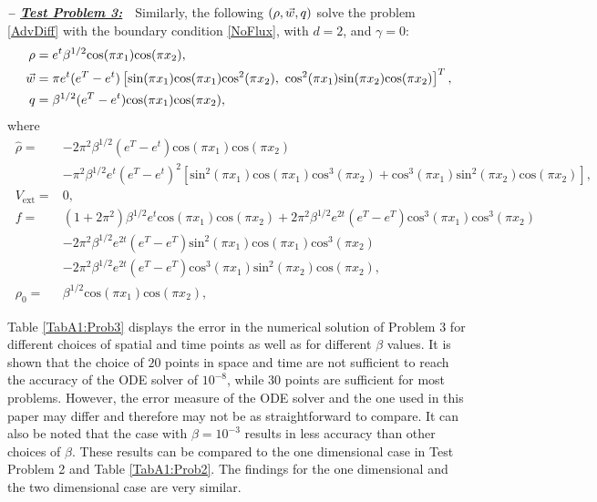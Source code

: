 \textbf{\emph{-- \underline{Test Problem 3:}}}~~Similarly, the following $(\rho,\vec{w},q)$ solve the problem \eqref{AdvDiff} with the boundary condition \eqref{NoFlux}, with $d=2$, and $\gamma =0$:
\begin{align*}
\ \rho={}&e^{t}\beta^{1/2}\text{cos}(\pi{}x_1)\text{cos}(\pi{}x_2), \\
\ \vec{w}={}&\pi e^{t}(e^{T}-e^{t})\left[\text{sin}(\pi{}x_1)\text{cos}(\pi{}x_1)\text{cos}^2(\pi{}x_2),~\text{cos}^2(\pi{}x_1)\text{sin}(\pi{}x_2)\text{cos}(\pi{}x_2)\right]^T, \\
\ \adj={}&\beta^{1/2}(e^{T}-e^{t})\text{cos}(\pi{}x_1)\text{cos}(\pi{}x_2),
\end{align*}
where
\begin{align*}
\ \widehat{\rho}={}&-2\pi^2{}\beta^{1/2}(e^{T}-e^{t})\text{cos}(\pi{}x_1)\text{cos}(\pi{}x_2) \\
\ &-\pi^2\beta^{1/2}e^{t}(e^{T}-e^{t})^2\left[\text{sin}^2(\pi{}x_1)\text{cos}(\pi{}x_1)\text{cos}^3(\pi{}x_2)+\text{cos}^3(\pi{}x_1)\text{sin}^2(\pi{}x_2)\text{cos}(\pi{}x_2)\right], \\
\ V_{\text{ext}}={}&0, \\
\ f={}&(1+2\pi^2)\beta^{1/2}e^{t}\text{cos}(\pi{}x_1)\text{cos}(\pi{}x_2)+ 2\pi^2 \beta^{1/2}e^{2t}(e^{T}-e^{T})\text{cos}^3(\pi{}x_1)\text{cos}^3(\pi{}x_2) \\
\ &-2\pi^2 \beta^{1/2}e^{2t}(e^{T}-e^{T})\text{sin}^2(\pi{}x_1)\text{cos}(\pi{}x_1)\text{cos}^3(\pi{}x_2) \\
\ &-2\pi^2 \beta^{1/2}e^{2t}(e^{T}-e^{T})\text{cos}^3(\pi{}x_1)\text{sin}^2(\pi{}x_2)\text{cos}(\pi{}x_2), \\
\ \rho_{0}={}&\beta^{1/2}\text{cos}(\pi{}x_1)\text{cos}(\pi{}x_2),
\end{align*}


Table \ref{TabA1:Prob3} displays the error in the numerical solution of Problem 3 for different choices of spatial and time points as well as for different $\beta$ values. It is shown that the choice of $20$ points in space and time are not sufficient to reach the accuracy of the ODE solver of $10^{-8}$, while $30$ points are sufficient for most problems. However, the error measure of the ODE solver and the one used in this paper may differ and therefore may not be as straightforward to compare. It can also be noted that the case with $\beta = 10^{-3}$ results in less accuracy than other choices of $\beta$. These results can be compared to the one dimensional case in Test Problem 2 and Table \ref{TabA1:Prob2}. The findings for the one dimensional and the two dimensional case are very similar.


